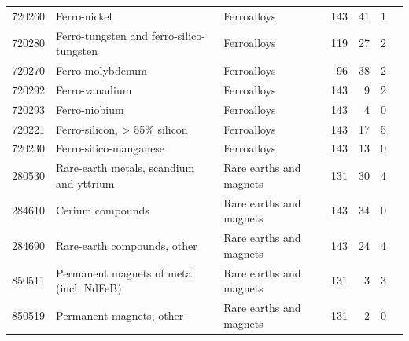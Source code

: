 \documentclass[10pt,a4paper]{article}
\begin{document}
\begin{minipage}{\linewidth}
\begin{tabular}{llp{3.2cm}rrrl}
720260 & Ferro-nickel & Ferroalloys & 143 & 41 & 1 &  \\
720280 & Ferro-tungsten and ferro-silico-tungsten & Ferroalloys & 119 & 27 & 2 &  \\
720270 & Ferro-molybdenum & Ferroalloys & 96 & 38 & 2 &  \\
720292 & Ferro-vanadium & Ferroalloys & 143 & 9 & 2 &  \\
720293 & Ferro-niobium & Ferroalloys & 143 & 4 & 0 &  \\
720221 & Ferro-silicon, > 55\% silicon & Ferroalloys & 143 & 17 & 5 &  \\
720230 & Ferro-silico-manganese & Ferroalloys & 143 & 13 & 0 &  \\
280530 & Rare-earth metals, scandium and yttrium & Rare earths and magnets & 131 & 30 & 4 &  \\
284610 & Cerium compounds & Rare earths and magnets & 143 & 34 & 0 &  \\
284690 & Rare-earth compounds, other & Rare earths and magnets & 143 & 24 & 4 &  \\
850511 & Permanent magnets of metal (incl. NdFeB) & Rare earths and magnets & 131 & 3 & 3 &  \\
850519 & Permanent magnets, other & Rare earths and magnets & 131 & 2 & 0 &  \\
\bottomrule
\end{tabular}
\end{minipage}
\vspace{8pt}
\end{document}
